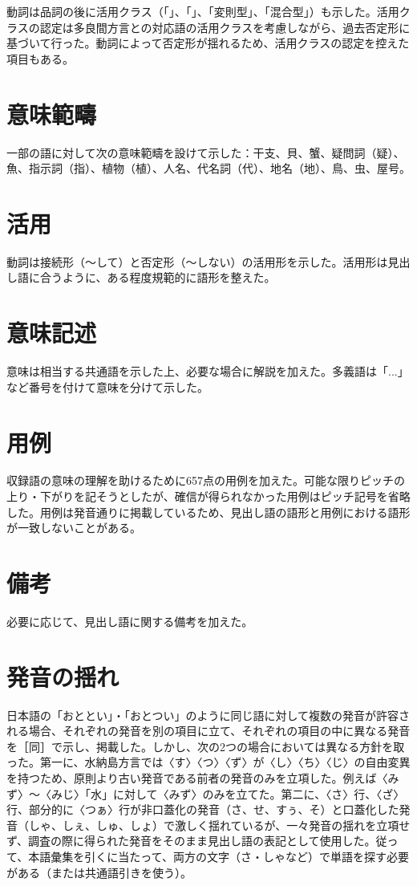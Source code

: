 動詞は品詞の後に活用クラス（「」、「」、「変則型」、「混合型」）も示した。活用クラスの認定は多良間方言との対応語の活用クラスを考慮しながら、過去否定形に基づいて行った。動詞によって否定形が揺れるため、活用クラスの認定を控えた項目もある。

\section{意味範疇}

一部の語に対して次の意味範疇を設けて示した：干支、貝、蟹、疑問詞（疑）、魚、指示詞（指）、植物（植）、人名、代名詞（代）、地名（地）、鳥、虫、屋号。

\section{活用}

動詞は接続形（〜して）と否定形（〜しない）の活用形を示した。活用形は見出し語に合うように、ある程度規範的に語形を整えた。

\section{意味記述}

意味は相当する共通語を示した上、必要な場合に解説を加えた。多義語は「...」など番号を付けて意味を分けて示した。

\section{用例}

収録語の意味の理解を助けるために657点の用例を加えた。可能な限りピッチの上り・下がりを記そうとしたが、確信が得られなかった用例はピッチ記号を省略した。用例は発音通りに掲載しているため、見出し語の語形と用例における語形が一致しないことがある。

\section{備考}

必要に応じて、見出し語に関する備考を加えた。

\section{発音の揺れ}

日本語の「おととい」・「おとつい」のように同じ語に対して複数の発音が許容される場合、それぞれの発音を別の項目に立て、それぞれの項目の中に異なる発音を［同］で示し、掲載した。しかし、次の2つの場合においては異なる方針を取った。第一に、水納島方言では〈す〉〈つ〉〈ず〉が〈し〉〈ち〉〈じ〉の自由変異を持つため、原則より古い発音である前者の発音のみを立項した。例えば〈みず〉\ws{}～\ws{}〈みじ〉「水」に対して〈みず〉のみを立てた。第二に、〈さ〉行、〈ざ〉行、部分的に〈つぁ〉行が非口蓋化の発音（さ、せ、すぅ、そ）と口蓋化した発音（しゃ、しぇ、しゅ、しょ）で激しく揺れているが、一々発音の揺れを立項せず、調査の際に得られた発音をそのまま見出し語の表記として使用した。従って、本語彙集を引くに当たって、両方の文字（さ・しゃなど）で単語を探す必要がある（または共通語引きを使う）。%


